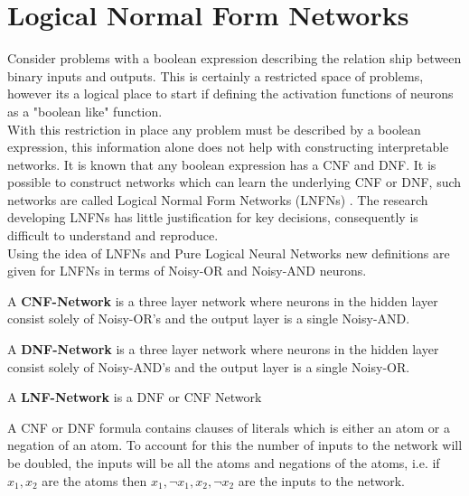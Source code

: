 \chapter{Logical Normal Form Networks}\label{C:workdone}
Consider problems with a boolean expression describing the relation ship between binary inputs and outputs. This is certainly a restricted space of problems, however its a logical place to start if defining the activation functions of neurons as a "boolean like" function.\\

With this restriction in place any problem must be described by a boolean expression, this information alone does not help with constructing interpretable networks. It is known that any boolean expression has a CNF and DNF. It is possible to construct networks which can learn the underlying CNF or DNF, such networks are called Logical Normal Form Networks (LNFNs) \cite{herrmann1996backpropagation}. The research developing LNFNs has little justification for key decisions, consequently is difficult to understand and reproduce.\\

Using the idea of LNFNs \cite{herrmann1996backpropagation} and Pure Logical Neural Networks \cite{LearningLogicalActivations} new definitions are given for LNFNs in terms of Noisy-OR and Noisy-AND neurons.

\theoremstyle{definition}
\begin{definition}
A \textbf{CNF-Network} is a three layer network where neurons in the hidden layer consist solely of Noisy-OR's and the output layer is a single Noisy-AND. 
\end{definition}

\theoremstyle{definition}
\begin{definition}
A \textbf{DNF-Network} is a three layer network where neurons in the hidden layer consist solely of Noisy-AND's and the output layer is a single Noisy-OR. 
\end{definition}

\theoremstyle{definition}
\begin{definition}
A \textbf{LNF-Network} is a DNF or CNF Network
\end{definition}

A CNF or DNF formula contains clauses of literals which is either an atom or a negation of an atom. To account for this the number of inputs to the network will be doubled, the inputs will be all the atoms and negations of the atoms, i.e. if $x_1, x_2$ are the atoms then $x_1, \lnot x_1, x_2, \lnot x_2$ are the inputs to the network.\\ 


